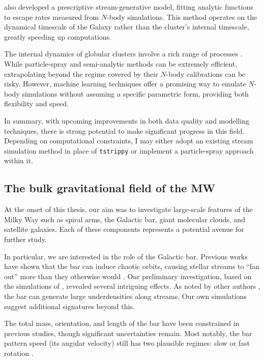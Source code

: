         \citet{2015MNRAS.452..301F} also developed a prescriptive stream-generative model, fitting analytic functions to escape rates measured from $N$-body simulations. This method operates on the dynamical timescale of the Galaxy rather than the cluster's internal timescale, greatly speeding up computations.  

        The internal dynamics of globular clusters involve a rich range of processes \citep{1997A&ARv...8....1M}. While particle-spray and semi-analytic methods can be extremely efficient, extrapolating beyond the regime covered by their $N$-body calibrations can be risky. However, machine learning techniques \citep{2023ApJ...959...99T} offer a promising way to emulate $N$-body simulations without assuming a specific parametric form, providing both flexibility and speed.

        In summary, with upcoming improvements in both data quality and modelling techniques, there is strong potential to make significant progress in this field. Depending on computational constraints, I may either adopt an existing stream simulation method in place of \texttt{tstrippy} or implement a particle-spray approach within it.

    \subsection{The bulk gravitational field of the MW}
        At the onset of this thesis, our aim was to investigate large-scale features of the Milky Way such as spiral arms, the Galactic bar, giant molecular clouds, and satellite galaxies. Each of these components represents a potential avenue for further study.  

        In particular, we are interested in the role of the Galactic bar. Previous works have shown that the bar can induce chaotic orbits, causing stellar streams to ``fan out'' more than they otherwise would \citep{2016ApJ...824..104P,2020ApJ...889...70B}. Our preliminary investigation, based on the simulations of \citet{2023A&A...673A..44F}, revealed several intriguing effects. As noted by other authors \citep[see Fig.~9 of][]{2025NewAR.10001713B}, the bar can generate large underdensities along streams. Our own simulations suggest additional signatures beyond this.  

        The total mass, orientation, and length of the bar have been constrained in previous studies, though significant uncertainties remain. Most notably, the bar pattern speed (its angular velocity) still has two plausible regimes: slow or fast rotation \citep{2015MNRAS.450.4050W,2016ARA&A..54..529B,2023MNRAS.520.4779L,2024MNRAS.528.3576V}.  

